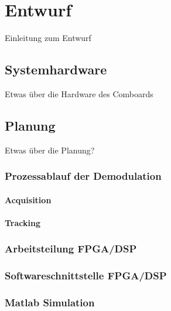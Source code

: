 \chapter{Entwurf}
Einleitung zum Entwurf

\section{Systemhardware}
Etwas über die Hardware des Comboards

\section{Planung}
Etwas über die Planung?

\subsection{Prozessablauf der Demodulation}
\subsubsection{Acquisition}
\subsubsection{Tracking}

\subsection{Arbeitsteilung FPGA/DSP}

\subsection{Softwareschnittstelle FPGA/DSP}

\subsection{Matlab Simulation}

